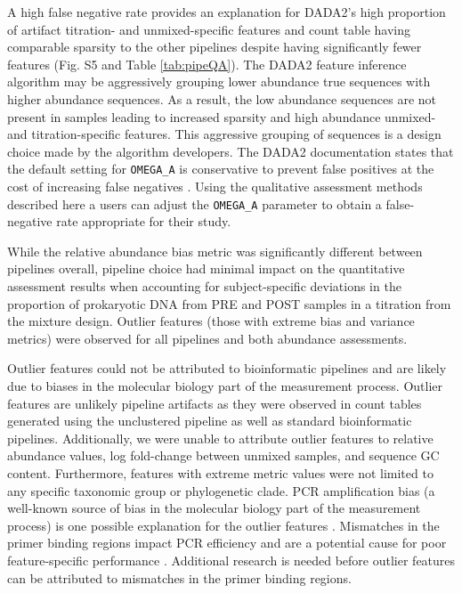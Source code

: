 \documentclass{bmcart}
\begin{document}
A high false negative rate provides an explanation for DADA2's high proportion
of artifact titration- and unmixed-specific features and count table having
comparable sparsity to the other pipelines despite having significantly fewer
features (Fig. S5 and Table \ref{tab:pipeQA}).
The DADA2 feature inference algorithm may be aggressively grouping
lower abundance true sequences with higher abundance sequences.
As a result, the low abundance sequences are not present in samples
leading to increased sparsity and high abundance unmixed- and titration-specific features.
This aggressive grouping of sequences is a design choice made by the algorithm developers.
The DADA2 documentation states that the default setting for \texttt{OMEGA\_A}
is conservative to prevent false positives at the cost of increasing false negatives \cite{callahan2016dada2}.
Using the qualitative assessment methods described here a users can
adjust the \texttt{OMEGA\_A} parameter to obtain a false-negative rate appropriate for their study.

While the relative abundance bias metric was significantly different
between pipelines overall, pipeline choice had minimal impact on the
quantitative assessment results when accounting for subject-specific deviations
in the proportion of prokaryotic DNA from PRE and POST samples in a
titration from the mixture design. Outlier features (those with extreme bias
and variance metrics) were observed for all pipelines and both abundance assessments.

Outlier features could not be attributed to bioinformatic pipelines
and are likely due to biases in the molecular biology part of the measurement process.
Outlier features are unlikely pipeline artifacts as they were observed in count tables generated
using the unclustered pipeline as well as standard bioinformatic
pipelines. Additionally, we were unable to attribute outlier features to relative
abundance values, log fold-change between unmixed samples, and sequence
GC content. Furthermore, features with extreme metric values were not limited to any
specific taxonomic group or phylogenetic clade. PCR amplification
bias (a well-known source of bias in the molecular biology part of the
measurement process) is one possible explanation for the outlier features \cite{Sze565598}.
Mismatches in the primer binding regions impact PCR efficiency
and are a potential cause for poor feature-specific
performance \cite{wright2014exploiting}. Additional research is
needed before outlier features can be attributed to mismatches in the primer binding regions.
\end{document}
